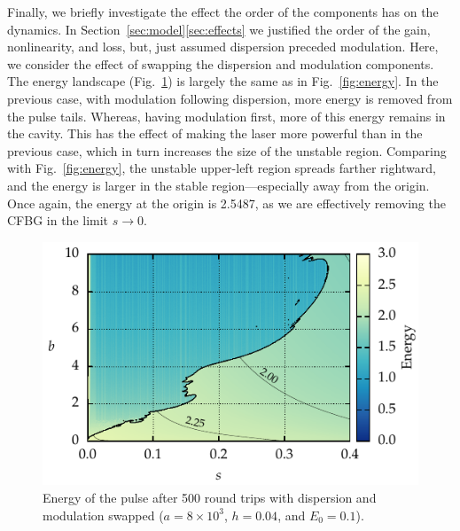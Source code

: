 \documentclass[9pt,twocolumn,twoside]{osajnl}
\begin{document}
Finally, we briefly investigate the effect the order of the components has on the dynamics. In Section~\ref{sec:model}\ref{sec:effects} we justified the order of the gain, nonlinearity, and loss, but, just assumed dispersion preceded modulation. Here, we consider the effect of swapping the dispersion and modulation components. The energy landscape (Fig.~\ref{fig:energyswitch}) is largely the same as in Fig.~\ref{fig:energy}. In the previous case, with modulation following dispersion, more energy is removed from the pulse tails. Whereas, having modulation first, more of this energy remains in the cavity. This has the effect of making the laser more powerful than in the previous case, which in turn increases the size of the unstable region. Comparing with Fig.~\ref{fig:energy}, the unstable upper-left region spreads farther rightward, and the energy is larger in the stable region---especially away from the origin. Once again, the energy at the origin is 2.5487, as we are effectively removing the CFBG in the limit $s \rightarrow 0$.

\begin{figure}[tbp]
	\centering
	\includegraphics{Figures/ParamSpaceEnergySwitch}
	\caption{Energy of the pulse after 500 round trips with dispersion and modulation swapped ($a = 8 \times 10^3$, $h = 0.04$, and $E_0 = 0.1$).}
	\label{fig:energyswitch}
\end{figure}
\end{document}
